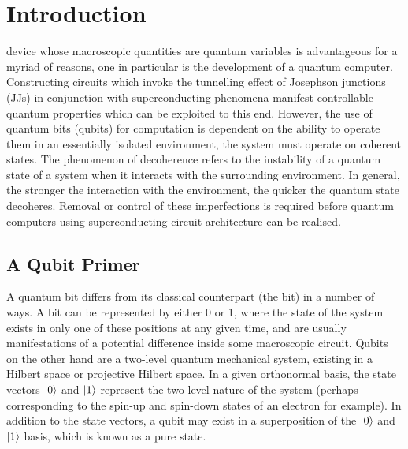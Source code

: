 \chapter{Introduction}\label{ch:introduction}

 device whose macroscopic quantities are quantum variables is advantageous for a myriad of reasons, one in particular is the development of a quantum computer.
Constructing circuits which invoke the tunnelling effect of Josephson junctions (JJs) in conjunction with superconducting phenomena manifest controllable quantum properties which can be exploited to this end.
However, the use of quantum bits (qubits) for computation is dependent on the ability to operate them in an essentially isolated environment, \ie the system must operate on coherent states.
The phenomenon of decoherence refers to the instability of a quantum state of a system when it interacts with the surrounding environment.
In general, the stronger the interaction with the environment, the quicker the quantum state decoheres.
Removal or control of these imperfections is required before quantum computers using superconducting circuit architecture can be realised.

\section{A Qubit Primer}
A quantum bit differs from its classical counterpart (the bit) in a number of ways.
A bit can be represented by either 0 or 1, where the state of the system exists in only one of these positions at any given time, and are usually manifestations of a potential difference inside some macroscopic circuit.
Qubits on the other hand are a two-level quantum mechanical system, existing in a Hilbert space or projective Hilbert space.
In a given orthonormal basis, the state vectors $\lvert0\rangle$ and $\lvert1\rangle$ represent the two level nature of the system (perhaps corresponding to the spin-up and spin-down states of an electron for example).
In addition to the state vectors, a qubit may exist in a superposition of the $\lvert0\rangle$ and $\lvert1\rangle$ basis, which is known as a pure state.

